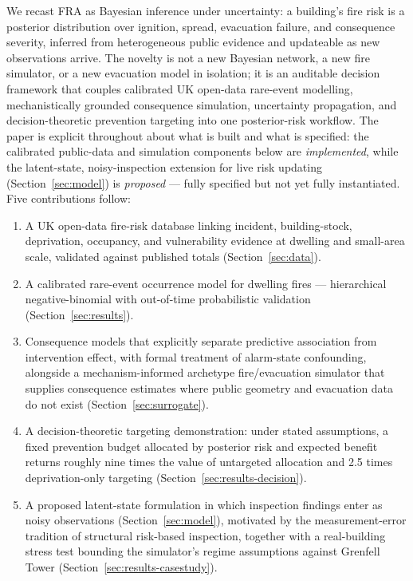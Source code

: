 We recast FRA as Bayesian inference under uncertainty: a building's fire risk is a
posterior distribution over ignition, spread, evacuation failure, and consequence
severity, inferred from heterogeneous public evidence and updateable as new
observations arrive. The novelty is not a new Bayesian network, a new fire
simulator, or a new evacuation model in isolation; it is an auditable decision
framework that couples calibrated UK open-data rare-event modelling,
mechanistically grounded consequence simulation, uncertainty propagation, and
decision-theoretic prevention targeting into one posterior-risk workflow. The paper
is explicit throughout about what is built and what is specified: the calibrated
public-data and simulation components below are \emph{implemented}, while the
latent-state, noisy-inspection extension for live risk updating
(Section~\ref{sec:model}) is \emph{proposed} --- fully specified but not yet fully
instantiated. Five contributions follow:

\begin{enumerate}
  \item A UK open-data fire-risk database linking incident, building-stock,
        deprivation, occupancy, and vulnerability evidence at dwelling and
        small-area scale, validated against published totals
        (Section~\ref{sec:data}).
  \item A calibrated rare-event occurrence model for dwelling fires ---
        hierarchical negative-binomial with out-of-time probabilistic validation
        (Section~\ref{sec:results}).
  \item Consequence models that explicitly separate predictive association from
        intervention effect, with formal treatment of alarm-state confounding,
        alongside a mechanism-informed archetype fire/evacuation simulator that
        supplies consequence estimates where public geometry and evacuation data
        do not exist (Section~\ref{sec:surrogate}).
  \item A decision-theoretic targeting demonstration: under stated assumptions, a
        fixed prevention budget allocated by posterior risk and expected benefit
        returns roughly nine times the value of untargeted allocation and 2.5
        times deprivation-only targeting (Section~\ref{sec:results-decision}).
  \item A proposed latent-state formulation in which inspection findings enter as
        noisy observations (Section~\ref{sec:model}), motivated by the
        measurement-error tradition of structural risk-based inspection, together
        with a real-building stress test bounding the simulator's regime
        assumptions against Grenfell Tower
        (Section~\ref{sec:results-casestudy}).
\end{enumerate}
